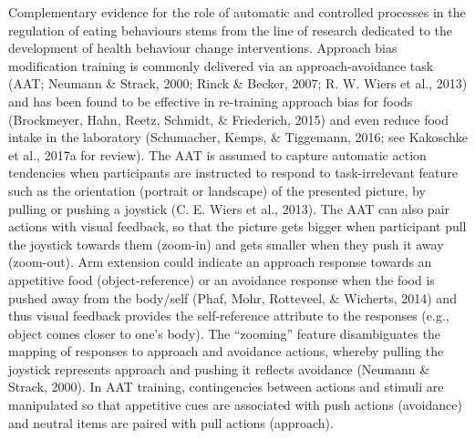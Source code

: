\documentclass[man]{apa6}
\begin{document}
Complementary evidence for the role of automatic and controlled processes in the regulation of eating behaviours stems from the line of research dedicated to the development of health behaviour change interventions. Approach bias modification training is commonly delivered via an approach-avoidance task (AAT; Neumann \& Strack, 2000; Rinck \& Becker, 2007; R. W. Wiers et al., 2013) and has been found to be effective in re-training approach bias for foods (Brockmeyer, Hahn, Reetz, Schmidt, \& Friederich, 2015) and even reduce food intake in the laboratory (Schumacher, Kemps, \& Tiggemann, 2016; see Kakoschke et al., 2017a for review). The AAT is assumed to capture automatic action tendencies when participants are instructed to respond to task-irrelevant feature such as the orientation (portrait or landscape) of the presented picture, by pulling or pushing a joystick (C. E. Wiers et al., 2013). The AAT can also pair actions with visual feedback, so that the picture gets bigger when participant pull the joystick towards them (zoom-in) and gets smaller when they push it away (zoom-out). Arm extension could indicate an approach response towards an appetitive food (object-reference) or an avoidance response when the food is pushed away from the body/self (Phaf, Mohr, Rotteveel, \& Wicherts, 2014) and thus visual feedback provides the self-reference attribute to the responses (e.g., object comes closer to one's body). The \enquote{zooming} feature disambiguates the mapping of responses to approach and avoidance actions, whereby pulling the joystick represents approach and pushing it reflects avoidance (Neumann \& Strack, 2000). In AAT training, contingencies between actions and stimuli are manipulated so that appetitive cues are associated with push actions (avoidance) and neutral items are paired with pull actions (approach).

\par
\end{document}
